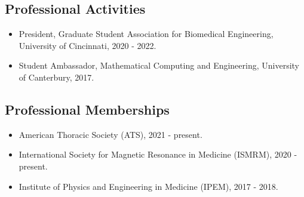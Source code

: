 \documentclass[12pt,]{scrartcl}
\begin{document}




\subsection{Professional Activities}\label{professional-activities}

\begin{itemize}
  \leftskip-0.25in
  \item President, Graduate Student Association for Biomedical Engineering, University of Cincinnati, 2020 - 2022.
  \item Student Ambassador, Mathematical Computing and Engineering, University of Canterbury, 2017.

\end{itemize}

\subsection{Professional Memberships}\label{professional-memberships}

\begin{itemize}
  \leftskip-0.25in
  \item American Thoracic Society (ATS), 2021 - present.
  \item International Society for Magnetic Resonance in Medicine (ISMRM), 2020 - present.
  \item Institute of Physics and Engineering in Medicine (IPEM), 2017 - 2018.
\end{itemize}
\end{document}
